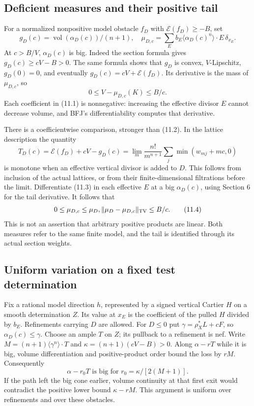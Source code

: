 \documentclass[10pt]{article}
\newcommand{\vol}{\operatorname{vol}}
\begin{document}
\subsection{Deficient measures and their positive tail}
For a normalized nonpositive model obstacle $f_D$ with
$\mathscr E(f_D)\geq-B$, set
\[
 g_D(c)=\vol(\alpha_D(c))/(n+1),\quad
 \mu_{D,c}=\sum_E b_E\langle\alpha_D(c)^n\rangle\cdot E\,\delta_{x_E}.
                                                               \tag{11.1}
\]
At $c>B/V$, $\alpha_D(c)$ is big. Indeed the section formula gives
$g_D(c)\geq cV-B>0$. The same formula shows that $g_D$ is convex,
$V$-Lipschitz, $g_D(0)=0$, and eventually
$g_D(c)=cV+\mathscr E(f_D)$. Its derivative is the mass of $\mu_{D,c}$,
so
\[
 0\leq V-\mu_{D,c}(K)\leq B/c.                     \tag{11.2}
\]
Each coefficient in (11.1) is nonnegative: increasing the effective
divisor $E$ cannot decrease volume, and BFJ's differentiability computes
that derivative.

There is a coefficientwise comparison, stronger than (11.2). In the
lattice description the quantity
\[
 T_D(c)=\mathscr E(f_D)+cV-g_D(c)
       =\lim_m\frac{n!}{m^{n+1}}\sum_j\min(w_{mj}+mc,0)          \tag{11.3}
\]
is monotone when an effective vertical divisor is added to $D$.
This follows from inclusion of the actual lattices, or from their
finite-dimensional filtrations before the limit. Differentiate (11.3)
in each effective $E$ at a big $\alpha_D(c)$, using Section 6 for the
tail derivative. It follows that
\[
 0\leq\mu_{D,c}\leq\mu_D,
           \|\mu_D-\mu_{D,c}\|_{\rm TV}\leq B/c.     \tag{11.4}
\]
This is not an assertion that arbitrary positive products are linear.
Both measures refer to the same finite model, and the tail is identified
through its actual section weights.

\subsection{Uniform variation on a fixed test determination}
Fix a rational model direction $h$, represented by a signed vertical
Cartier $H$ on a smooth determination $Z$. Its value at $x_E$ is
the coefficient of the pulled $H$ divided by $b_E$. Refinements carrying
$D$ are allowed. For $D\leq0$ put $\gamma=\rho_X^*L+cF$, so
$\alpha_D(c)\leq\gamma$. Choose an ample $T$ on $Z$; its pullback to a
refinement is nef. Write
$M=(n+1)\langle\gamma^n\rangle\cdot T$ and
$\kappa=(n+1)(cV-B)>0$. Along $\alpha-rT$ while it is big,
volume differentiation and positive-product order bound the loss by
$rM$. Consequently
\[
 \alpha-r_0T\text{ is big for }r_0=\kappa/[2(M+1)].  \tag{11.5}
\]
If the path left the big cone earlier, volume continuity at that first
exit would contradict the positive lower bound $\kappa-rM$.
This argument is uniform over refinements and over these obstacles.
\end{document}

